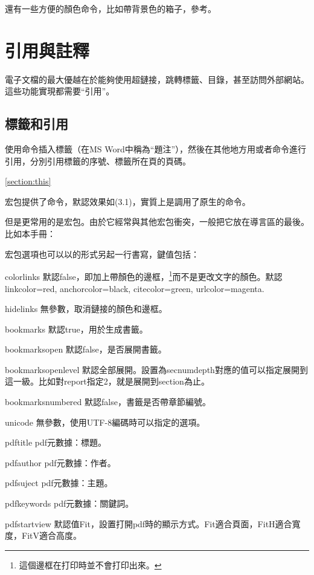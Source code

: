 還有一些方便的顏色命令，比如帶背景色的箱子，參考。

\section{引用與註釋}
電子文檔的最大優越在於能夠使用超鏈接，跳轉標籤、目錄，甚至訪問外部網站。這些功能實現都需要“引用”。
\subsection{標籤和引用}
使用命令插入標籤（在MS Word中稱為“題注”），然後在其他地方用或者命令進行引用，分別引用標籤的序號、標籤所在頁的頁碼。
\begin{latex}
\label{section:this}
\ref{section:this}
\pageref{section:this}
\end{latex}

宏包提供了命令，默認效果如(3.1)，實質上是調用了原生的命令。

但是更常用的是宏包。由於它經常與其他宏包衝突，一般把它放在導言區的最後。比如本手冊：
\begin{latex}
\usepackage[colorlinks,bookmarksopen=true,
    bookmarksnumbered=true]{hyperref}
\end{latex}

宏包選項也可以以的形式另起一行書寫，鍵值包括：
\begin{para}
\item[colorlinks] 默認false，即加上帶顏色的邊框，\footnote{這個邊框在打印時並不會打印出來。}而不是更改文字的顏色。默認linkcolor=red, anchorcolor=black, citecolor=green, urlcolor=magenta. 
\item[hidelinks] 無參數，取消鏈接的顏色和邊框。
\item[bookmarks] 默認true，用於生成書籤。
\item[bookmarksopen] 默認false，是否展開書籤。
\item[bookmarksopenlevel] 默認全部展開。設置為secnumdepth對應的值可以指定展開到這一級。比如對report指定2，就是展開到section為止。
\item[bookmarksnumbered] 默認false，書籤是否帶章節編號。
\item[unicode] 無參數，使用UTF-8編碼時可以指定的選項。
\item[pdftitle] pdf元數據：標題。
\item[pdfauthor] pdf元數據：作者。
\item[pdfsuject] pdf元數據：主題。
\item[pdfkeywords] pdf元數據：關鍵詞。
\item[pdfstartview] 默認值Fit，設置打開pdf時的顯示方式。Fit適合頁面，FitH適合寬度，FitV適合高度。
\end{para}

